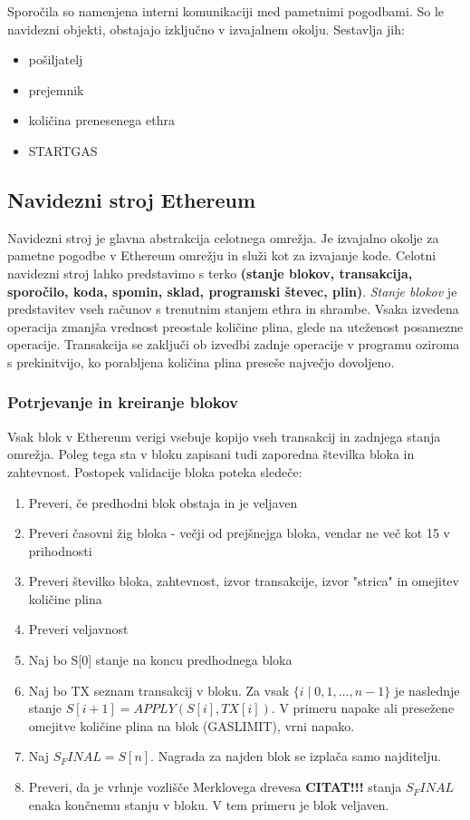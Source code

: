 \documentclass[a4paper, 12pt]{book}
\begin{document}
Sporočila so namenjena interni komunikaciji med pametnimi pogodbami.
So le navidezni objekti, obstajajo izključno v izvajalnem okolju.
Sestavlja jih:
\begin{itemize}
	\item pošiljatelj
	\item prejemnik
	\item količina prenesenega ethra
	\item STARTGAS
\end{itemize}
\cite{ethereumWhitepaper}

\subsection{Navidezni stroj Ethereum}

Navidezni stroj je glavna abstrakcija celotnega omrežja.
Je izvajalno okolje za pametne pogodbe v Ethereum omrežju in služi kot  za izvajanje kode.
Celotni navidezni stroj lahko predstavimo s terko \textbf{(stanje blokov, transakcija, sporočilo, koda, spomin, sklad, programski števec, plin)}.
\textit{Stanje blokov} je predstavitev vseh računov s trenutnim stanjem ethra in shrambe.
Vsaka izvedena operacija zmanjša vrednost preostale količine plina, glede na uteženost posamezne operacije.
Transakcija se zaključi ob izvedbi zadnje operacije v programu oziroma s prekinitvijo, ko porabljena količina plina preseše največjo dovoljeno.


\subsubsection{Potrjevanje in kreiranje blokov}
Vsak blok v Ethereum verigi vsebuje kopijo vseh transakcij in zadnjega stanja omrežja.
Poleg tega sta v bloku zapisani tudi zaporedna številka bloka in zahtevnost.
Postopek validacije bloka poteka sledeče:
\begin{enumerate}
\item Preveri, če predhodni blok obstaja in je veljaven
\item Preveri časovni žig bloka - večji od prejšnejga bloka, vendar ne več kot 15 v prihodnosti
\item Preveri številko bloka, zahtevnost, izvor transakcije, izvor "strica" in omejitev količine plina
\item Preveri veljavnost 
\item Naj bo S[0] stanje na koncu predhodnega bloka
\item Naj bo TX seznam transakcij v bloku. Za vsak 
$\{i \mid 0,1,\dots, n-1\}$
je naslednje stanje
 $S[i+1] = APPLY(S[i], TX[i])$.
V primeru napake ali presežene omejitve količine plina na blok (GASLIMIT), vrni napako.
\item Naj $S_FINAL = S[n]$. Nagrada za najden blok se izplača samo najditelju.
\item Preveri, da je vrhnje vozlišče Merklovega drevesa \textbf{CITAT!!!} stanja $S_FINAL$ enaka končnemu stanju v bloku. V tem primeru je blok veljaven.
\end{enumerate}
\end{document}
